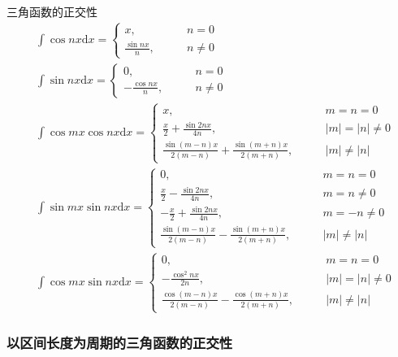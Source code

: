 \documentclass[lang = cn, scheme = chinese, thmcnt = section]{elegantbook}
\newcommand{\dd}{\mathrm{d}}           %
\newcommand{\dis}{\displaystyle}
\begin{document}
\begin{theorem}{三角函数的正交性}
	\begin{align*}
		& \int\cos nx\dd x=\begin{cases}
			x,\qquad & n=0\\
			\dis\frac{\sin nx}{n},\qquad & n\ne 0
		\end{cases}\\
		& \int\sin nx\dd x=\begin{cases}
			0,\qquad & n=0\\
			\dis-\frac{\cos nx}{n},\qquad & n\ne 0
		\end{cases}\\
		& \int\cos mx\cos nx \dd x=\begin{cases}
			x,\qquad & m=n=0\\
			\dis\frac{x}{2}+\frac{\sin 2nx}{4n},\qquad & |m|=|n|\ne 0\\
			\dis\frac{\sin(m-n)x}{2(m-n)}+\frac{\sin(m+n)x}{2(m+n)},\qquad & |m|\ne |n|
		\end{cases}\\
		& \int\sin mx\sin nx \dd x=\begin{cases}
			0,\qquad & m=n=0\\
			\dis\frac{x}{2}-\frac{\sin 2nx}{4n},\qquad & m=n\ne 0\\
			\dis-\frac{x}{2}+\frac{\sin 2nx}{4n},\qquad & m=-n\ne 0\\
			\dis\frac{\sin(m-n)x}{2(m-n)}-\frac{\sin(m+n)x}{2(m+n)},\qquad & |m|\ne |n|
		\end{cases}\\
		& \int\cos mx\sin nx \dd x=\begin{cases}
			0,\qquad & m=n=0\\
			\dis-\frac{\cos^2nx}{2n},\qquad & |m|=|n|\ne 0\\
			\dis\frac{\cos(m-n)x}{2(m-n)}-\frac{\cos(m+n)x}{2(m+n)},\qquad & |m|\ne |n|
		\end{cases}
	\end{align*}
\end{theorem}

\subsubsection{以区间长度为周期的三角函数的正交性}
\end{document}
